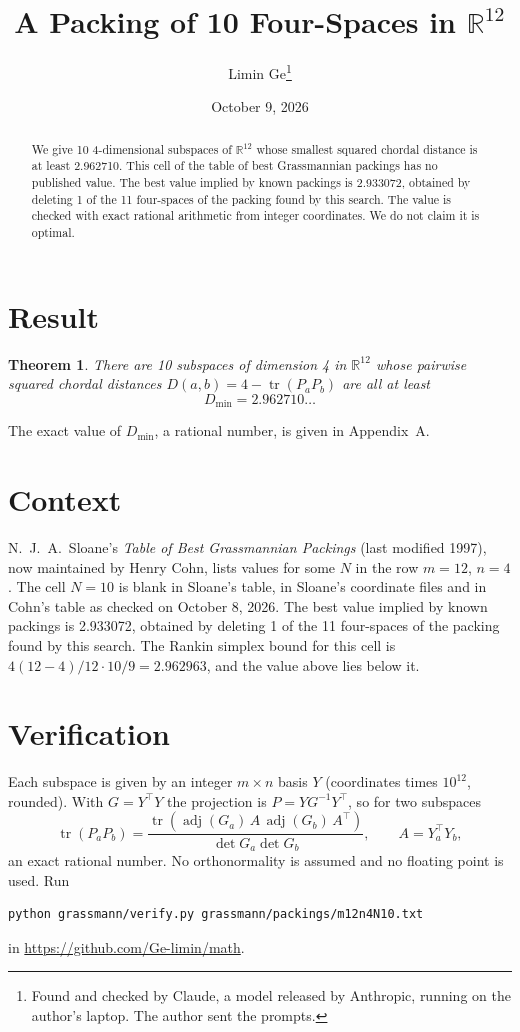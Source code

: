 \documentclass[11pt,a4paper]{article}
\title{A Packing of 10 Four-Spaces in $\mathbb{R}^{12}$}
\author{Limin Ge\thanks{Found and checked by Claude, a model released by Anthropic, running on the author's laptop. The author sent the prompts.}}
\date{October 9, 2026}
\newtheorem*{theorem}{Theorem}
\begin{document}
\maketitle
\begin{abstract}
We give 10 4-dimensional subspaces of $\mathbb{R}^{12}$ whose smallest squared chordal distance is at least 2.962710. This cell of the table of best Grassmannian packings has no published value. The best value implied by known packings is 2.933072, obtained by deleting 1 of the 11 four-spaces of the packing found by this search. The value is checked with exact rational arithmetic from integer coordinates. We do not claim it is optimal.
\end{abstract}

\section{Result}
\begin{theorem}
There are 10 subspaces of dimension 4 in $\mathbb{R}^{12}$ whose pairwise squared chordal distances $D(a,b) = 4 - \operatorname{tr}(P_aP_b)$ are all at least
\[ D_{\min} = 2.962710\ldots \]
\end{theorem}
The exact value of $D_{\min}$, a rational number, is given in Appendix~A.


\section{Context}
N.~J.~A.~Sloane's \emph{Table of Best Grassmannian Packings} (last modified 1997), now maintained by Henry Cohn, lists values for some $N$ in the row $m=12$, $n=4$. The cell $N=10$ is blank in Sloane's table, in Sloane's coordinate files and in Cohn's table as checked on October 8, 2026. The best value implied by known packings is 2.933072, obtained by deleting 1 of the 11 four-spaces of the packing found by this search. The Rankin simplex bound for this cell is $4(12-4)/12\cdot 10/9 = 2.962963$, and the value above lies below it.


\section{Verification}
Each subspace is given by an integer $m\times n$ basis $Y$ (coordinates times $10^{12}$, rounded). With $G=Y^\top Y$ the projection is $P=YG^{-1}Y^\top$, so for two subspaces
\[ \operatorname{tr}(P_aP_b)=\frac{\operatorname{tr}(\operatorname{adj}(G_a)\,A\,\operatorname{adj}(G_b)\,A^\top)}{\det G_a\det G_b},\qquad A=Y_a^\top Y_b, \]
an exact rational number. No orthonormality is assumed and no floating point is used. Run
\begin{verbatim}
python grassmann/verify.py grassmann/packings/m12n4N10.txt
\end{verbatim}
in \url{https://github.com/Ge-limin/math}.
\end{document}
